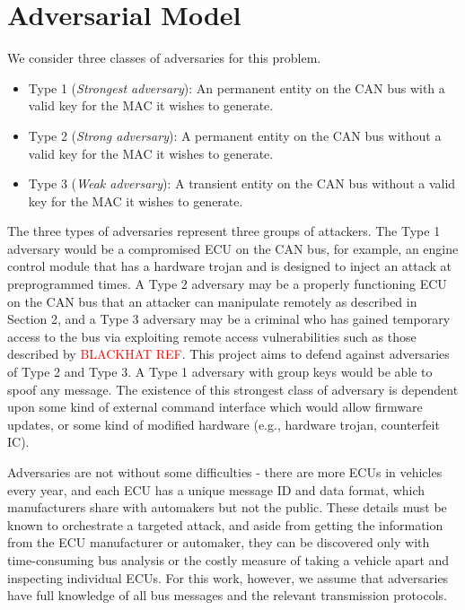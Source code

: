 \section{Adversarial Model}
\label{adversary}

We consider three classes of adversaries for this problem.

\begin{itemize}
	\item Type 1 (\textit{Strongest adversary}): An permanent entity on the CAN bus with a valid key for the MAC it wishes to generate.
	\item Type 2 (\textit{Strong adversary}): A permanent entity on the CAN bus without a valid key for the MAC it wishes to generate.
	\item Type 3 (\textit{Weak adversary}): A transient entity on the CAN bus without a valid key for the MAC it wishes to generate.
\end{itemize}

The three types of adversaries represent three groups of attackers. The Type 1 adversary would be a compromised ECU on the CAN bus, for example, an engine control module that has a hardware trojan and is designed to inject an attack at preprogrammed times. A Type 2 adversary may be a properly functioning ECU on the CAN bus that an attacker can manipulate remotely as described in Section 2, and a Type 3 adversary may be a criminal who has gained temporary access to the bus via exploiting remote access vulnerabilities such as those described by \textcolor{red}{BLACKHAT REF}. This project aims to defend against adversaries of Type 2 and Type 3. A Type 1 adversary with group keys would be able to spoof any message. The existence of this strongest class of adversary is dependent upon some kind of external command interface which would allow firmware updates, or some kind of modified hardware (e.g., hardware trojan, counterfeit IC).

Adversaries are not without some difficulties - there are more ECUs in vehicles every year, and each ECU has a unique message ID and data format, which manufacturers share with automakers but not the public. These details must be known to orchestrate a targeted attack, and aside from getting the information from the ECU manufacturer or automaker, they can be discovered only with time-consuming bus analysis or the costly measure of taking a vehicle apart and inspecting individual ECUs. For this work, however, we assume that adversaries have full knowledge of all bus messages and the relevant transmission protocols.

